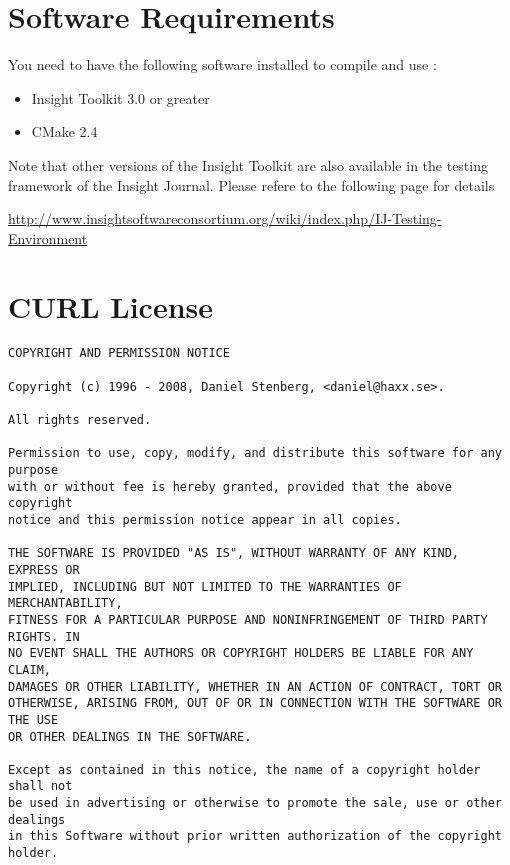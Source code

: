 \documentclass{InsightArticle}
\begin{document}
\section{Software Requirements}

You need to have the following software installed to compile and use :

\begin{itemize}
  \item  Insight Toolkit 3.0 or greater
  \item  CMake 2.4
\end{itemize}

Note that other versions of the Insight Toolkit are also available in the
testing framework of the Insight Journal. Please refere to the following page
for details

\url{http://www.insightsoftwareconsortium.org/wiki/index.php/IJ-Testing-Environment}

\section{CURL License}

\begin{verbatim}
COPYRIGHT AND PERMISSION NOTICE
 
Copyright (c) 1996 - 2008, Daniel Stenberg, <daniel@haxx.se>.
 
All rights reserved.
 
Permission to use, copy, modify, and distribute this software for any purpose
with or without fee is hereby granted, provided that the above copyright
notice and this permission notice appear in all copies.
 
THE SOFTWARE IS PROVIDED "AS IS", WITHOUT WARRANTY OF ANY KIND, EXPRESS OR
IMPLIED, INCLUDING BUT NOT LIMITED TO THE WARRANTIES OF MERCHANTABILITY,
FITNESS FOR A PARTICULAR PURPOSE AND NONINFRINGEMENT OF THIRD PARTY RIGHTS. IN
NO EVENT SHALL THE AUTHORS OR COPYRIGHT HOLDERS BE LIABLE FOR ANY CLAIM,
DAMAGES OR OTHER LIABILITY, WHETHER IN AN ACTION OF CONTRACT, TORT OR
OTHERWISE, ARISING FROM, OUT OF OR IN CONNECTION WITH THE SOFTWARE OR THE USE
OR OTHER DEALINGS IN THE SOFTWARE.
 
Except as contained in this notice, the name of a copyright holder shall not
be used in advertising or otherwise to promote the sale, use or other dealings
in this Software without prior written authorization of the copyright holder.
\end{verbatim}
\end{document}
